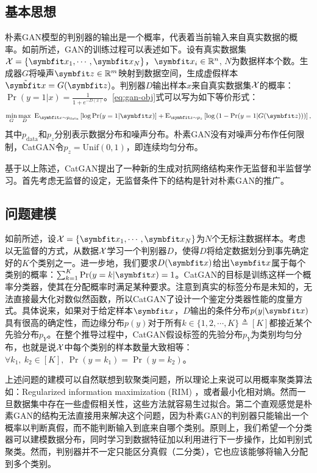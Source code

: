 \subsection{基本思想}
朴素GAN模型的判别器的输出是一个概率，代表着当前输入来自真实数据的概率。如前所述，GAN的训练过程可以表述如下。设有真实数据集$\Set{X} = \{\bd{x}_1, \cdots, \bd{x}_N\}$，$\bd{x}_i \in \reals^n$, $N$为数据样本个数。生成器$G$将噪声$\bd{z}\in \reals^m$映射到数据空间，生成虚假样本$\tilde{\bd{x}} = G(\bd{z})$。判别器$D$输出样本$x$来自真实数据集$\mathcal{X}$的概率：$\Pr(y=1 | x) = \frac{1}{1 + e^{-D(x)}}$。\eqref{eq:gan-obj}式可以写为如下等价形式：
\begin{equation}
  \min_G\max_D ~\E_{\bd{x} \sim p_{\text{data}}} \left[ \log \Pr(y=1|\bd{x}) \right]
  + \E_{\bd{z} \sim p_z} \left[ \log\left( 1 - \Pr(y=1|G(\bd{z})) \right) \right],
\end{equation}
其中$p_{\text{data}}$和$p_z$分别表示数据分布和噪声分布。朴素GAN没有对噪声分布作任何限制，CatGAN令$p_z = \text{Unif}(0,1)$，即连续均匀分布。

基于以上陈述，CatGAN提出了一种新的生成对抗网络结构来作无监督和半监督学习。首先考虑无监督的设定，无监督条件下的结构是针对朴素GAN的推广。

\subsection{问题建模}\label{sec:catgan-ps}
如前所述，设$\Set{X} = \{\bd{x}_1, \cdots, \bd{x}_N\}$为$N$个无标注数据样本。考虑以无监督的方式，从数据$\mathcal{X}$学习一个判别器$D$，使得$D$将给定数据划分到事先确定好的$K$个类别之一。进一步地，我们要求$D(\bd{x})$给出$\bd{x}$属于每个类别的概率：$\sum_{k=1}^K \Pr(y=k|\bd{x}) = 1$。CatGAN的目标是训练这样一个概率分类器，使其在分配概率时满足某种要求。注意到真实的标签分布是未知的，无法直接最大化对数似然函数，所以CatGAN了设计一个鉴定分类器性能的度量方式。具体说来，如果对于给定样本$\bd{x}$，$D$输出的条件分布$p(y|\bd{x})$具有很高的确定性，而边缘分布$p(y)$对于所有$k \in \{1,2,\cdots,K\} \triangleq [K]$都接近某个先验分布$p_Y$。在整个推导过程中，CatGAN假设标签的先验分布$p_Y$为类别均匀分布，也就是说$\mathcal{X}$中每个类别的样本数量大致相等：$\forall k_1, ~k_2 \in [K], ~\Pr(y=k_1) = \Pr(y=k_2)$。

上述问题的建模可以自然联想到软聚类问题，所以理论上来说可以用概率聚类算法如：Regularized information maximization (RIM) \citep{krause2010discriminative}，或者最小化相对熵\citep{grandvalet2005semi}。然而一旦数据集中存在一些虚假相关性，这些方法就容易生过拟合。第二个直观感觉是朴素GAN的结构无法直接用来解决这个问题，因为朴素GAN的判别器只能输出一个概率以判断真假，而不能判断输入到底来自哪个类别。原则上，我们希望一个分类器可以建模数据分布，同时学习到数据特征加以利用进行下一步操作，比如判别式聚类。然而，判别器并不一定只能区分真假（二分类），它也应该能够将输入分配到多个类别。

